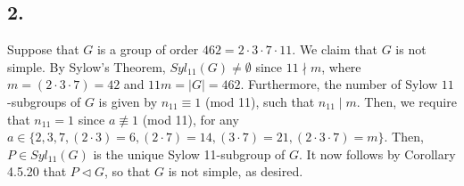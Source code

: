 \subsection*{2.} Suppose that $G$ is a group of order $462 = 2 \cdot 3 \cdot 7 \cdot 11$. We claim that $G$ is not simple. By Sylow's Theorem, $Syl_{11}(G) \not= \emptyset$ since $11 \nmid m$, where $m = (2 \cdot 3 \cdot 7) = 42$ and $11m = |G| = 462$. Furthermore, the number of Sylow $11$-subgroups of $G$ is given by $n_{11} \equiv 1$ (mod 11), such that $n_{11} \mid m$. Then, we require that $n_{11} = 1$ since $a \not\equiv 1$ (mod 11), for any $a \in \{2,3,7,(2\cdot3)=6, (2\cdot7)=14, (3\cdot7)=21, (2\cdot3\cdot7)=m\}$. Then, $P \in Syl_{11}(G)$ is the unique Sylow 11-subgroup of $G$. It now follows by Corollary 4.5.20 that $P \triangleleft G$, so that $G$ is not simple, as desired.